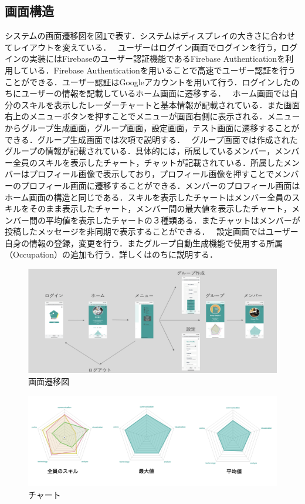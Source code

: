 \documentclass{funthesis}
\begin{document}
\subsection{画面構造}
システムの画面遷移図を図\ref{gamensenni}で表す．システムはディスプレイの大きさに合わせてレイアウトを変えている．
\ ユーザーはログイン画面でログインを行う，ログインの実装にはFirebaseのユーザー認証機能であるFirebase Authenticationを利用している．Firebase Authenticationを用いることで高速でユーザー認証を行うことができる．ユーザー認証はGoogleアカウントを用いて行う．ログインしたのちにユーザーの情報を記載しているホーム画面に遷移する．
\ ホーム画面では自分のスキルを表示したレーダーチャートと基本情報が記載されている．また画面右上のメニューボタンを押すことでメニューが画面右側に表示される．メニューからグループ生成画面，グループ画面，設定画面，テスト画面に遷移することができる．グループ生成画面では次項で説明する．
\ グループ画面では作成されたグループの情報が記載されている．具体的には，所属しているメンバー，メンバー全員のスキルを表示したチャート，チャットが記載されている．所属したメンバーはプロフィール画像で表示しており，プロフィール画像を押すことでメンバーのプロフィール画面に遷移することができる．メンバーのプロフィール画面はホーム画面の構造と同じである．スキルを表示したチャートはメンバー全員のスキルをそのまま表示したチャート，メンバー間の最大値を表示したチャート，メンバー間の平均値を表示したチャートの３種類ある．またチャットはメンバーが投稿したメッセージを非同期で表示することができる．
\ 設定画面ではユーザー自身の情報の登録，変更を行う．またグループ自動生成機能で使用する所属（Occupation）の追加も行う．詳しくはのちに説明する．


\begin{figure}[h]
 \centering
   \includegraphics[width=150mm]{figures/gamensenni.png}
 \caption{画面遷移図}
 \label{gamensenni}
\end{figure}

\begin{figure}[h]
 \centering
   \includegraphics[width=150mm]{figures/chart.png}
 \caption{チャート}
 \label{chart}
\end{figure}
\end{document}
